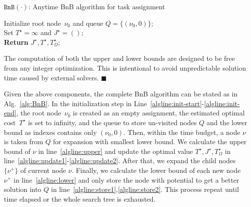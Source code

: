 \begin{algorithm}[t]
\caption{$\texttt{BnB}(\cdot)$: Anytime BnB algorithm for task assignment}
\label{alg:BnB}
Initialize root node~$\nu_0$ and queue $Q=\{(\nu_0,0)\}$; \label{algline:init-start}\\
Set $T^\star=\infty$ and $J^\star=()$;\label{algline:init-end}\\
\textbf{Return} $J^\star, T^\star, T^\star_\Omega$;
\end{algorithm}




\begin{remark}\label{remark:none-milp}
The computation of both the upper and lower bounds are designed
to be free from any integer optimization.
This is intentional to avoid unpredictable solution time caused by
external solvers.
\hfill $\blacksquare$
\end{remark}

Given the above components, the complete BnB algorithm can be stated as
in Alg.~\ref{alg:BnB}.
In the initialization step in
Line~\ref{algline:init-start}-\ref{algline:init-end},
the root node~$\nu_0$ is created as an empty assignment,
the estimated optimal cost~$T^{\star}$ is set to infinity,
and the queue to store un-visited nodes $Q$ and the lower bound as indexes contains only $(\nu_0,0)$.
Then, within the time budget, a node $\nu$ is taken from $Q$ for expansion with smallest lower bound.
We calculate the upper bound of $\nu$ in line~\ref{algline:upper} and update the optimal value $T^\star,J^\star,T^\star_\Omega$
in line~\ref{algline:update1}-\ref{algline:update2}.
After that, we expand the child nodes $\{\nu^+\}$ of current node $\nu$.
Finally, we calculate the lower bound of each new node $\nu^+$ in line~\ref{algline:lower} and only store
the node with potential to get a better solution into $Q$ in line~\ref{algline:store1},\ref{algline:store2}.
This process repeat until time elapsed or the whole search tree is
exhausted.

